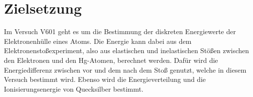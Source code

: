 \section{Zielsetzung} 

\begin{flushleft}
    Im Versuch V601 geht es um die Bestimmung der diskreten Energiewerte der Elektronenhülle eines Atoms.
    Die Energie kann dabei aus dem Elektronenstoßexperiment, also aus elastischen und inelastischen Stößen zwischen den Elektronen und den Hg-Atomen, berechnet werden.
    Dafür wird die Energiedifferenz zwischen vor und dem nach dem Stoß genutzt, welche in diesem Versuch bestimmt wird.
    Ebenso wird die Energieverteilung und die Ionisierungsenergie von Quecksilber bestimmt.
\end{flushleft}